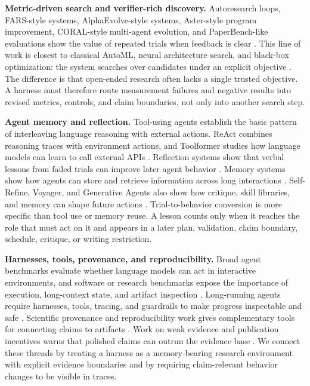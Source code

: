 \documentclass{article}
\begin{document}
\textbf{Metric-driven search and verifier-rich discovery.}
Autoresearch loops, FARS-style systems, AlphaEvolve-style systems, Aster-style program improvement, CORAL-style multi-agent evolution, and PaperBench-like evaluations show the value of repeated trials when feedback is clear \citep{karpathy2026autoresearch,analemma2026fars,novikov2025alphaevolvecodingagentscientific,bicker2026aster,qu2026coral,starace2025paperbenchevaluatingaisability}. This line of work is closest to classical AutoML, neural architecture search, and black-box optimization: the system searches over candidates under an explicit objective \citep{hutter2019automated,zoph2017neuralarchitecturesearchreinforcement}. The difference is that open-ended research often lacks a single trusted objective. A harness must therefore route measurement failures and negative results into revised metrics, controls, and claim boundaries, not only into another search step.

\textbf{Agent memory and reflection.}
Tool-using agents establish the basic pattern of interleaving language reasoning with external actions. ReAct combines reasoning traces with environment actions, and Toolformer studies how language models can learn to call external APIs \citep{yao2022react,schick2023toolformer}. Reflection systems show that verbal lessons from failed trials can improve later agent behavior \citep{shinn2023reflexionlanguageagentsverbal}. Memory systems show how agents can store and retrieve information across long interactions \citep{packer2024memgptllmsoperatingsystems}. Self-Refine, Voyager, and Generative Agents also show how critique, skill libraries, and memory can shape future actions \citep{madaan2023selfrefineiterativerefinementselffeedback,wang2023voyageropenendedembodiedagent,park2023generativeagentsinteractivesimulacra}. Trial-to-behavior conversion is more specific than tool use or memory reuse. A lesson counts only when it reaches the role that must act on it and appears in a later plan, validation, claim boundary, schedule, critique, or writing restriction.

\textbf{Harnesses, tools, provenance, and reproducibility.}
Broad agent benchmarks evaluate whether language models can act in interactive environments, and software or research benchmarks expose the importance of execution, long-context state, and artifact inspection \citep{liu2023agentbench,jimenez2023swebench,huang2023mlagentbench,starace2025paperbenchevaluatingaisability}. Long-running agents require harnesses, tools, tracing, and guardrails to make progress inspectable and safe \citep{anthropic2025harnesses,anthropic2025tools,openai2026tracing,openai2026guardrails}. Scientific provenance and reproducibility work gives complementary tools for connecting claims to artifacts \citep{733f89c65e4844f9aabcae1c276a5602,Gundersen_2018}. Work on weak evidence and publication incentives warns that polished claims can outrun the evidence base \citep{Ioannidis_2005}. We connect these threads by treating a harness as a memory-bearing research environment with explicit evidence boundaries and by requiring claim-relevant behavior changes to be visible in traces.
\end{document}
